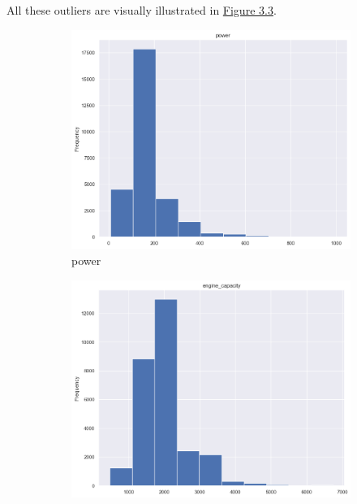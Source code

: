 All these outliers are visually illustrated in \hyperref[fig:outliers]{Figure 3.3}.

\begin{figure}[ht]
    \centering
    \begin{subfigure}[b]{0.32\linewidth}
        \centering
        \includegraphics[width=\linewidth]{images/priceprediction/outliers/power.png}
        \caption{power}
        \label{fig:power}
    \end{subfigure}
    \hfill
    \begin{subfigure}[b]{0.32\linewidth}
        \centering
        \includegraphics[width=\linewidth]{images/priceprediction/outliers/engine_capacity.png}

\end{subfigure}
\end{figure}
